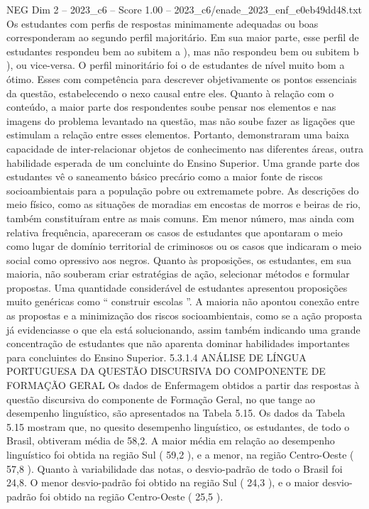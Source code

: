 \begin{textsample}{NEG Dim 2 – 2023\_c6 – Score 1.00 – 2023\_c6/enade\_2023\_enf\_e0eb49dd48.txt}
Os estudantes com perfis de respostas minimamente adequadas ou boas corresponderam ao segundo perfil majoritário.
Em sua maior parte, esse perfil de estudantes respondeu bem ao subitem a ), mas não respondeu bem ou subitem b ), ou vice-versa.
O perfil minoritário foi o de estudantes de nível muito bom a ótimo.
Esses com competência para descrever objetivamente os pontos essenciais da questão, estabelecendo o nexo causal entre eles.
Quanto à relação com o conteúdo, a maior parte dos respondentes soube pensar nos elementos e nas imagens do problema levantado na questão, mas não soube fazer as ligações que estimulam a relação entre esses elementos.
Portanto, demonstraram uma baixa capacidade de inter-relacionar objetos de conhecimento nas diferentes áreas, outra habilidade esperada de um concluinte do Ensino Superior.
Uma grande parte dos estudantes vê o saneamento básico precário como a maior fonte de riscos socioambientais para a população pobre ou extremamete pobre.
As descrições do meio físico, como as situações de moradias em encostas de morros e beiras de rio, também constituíram entre as mais comuns.
Em menor número, mas ainda com relativa frequência, apareceram os casos de estudantes que apontaram o meio como lugar de domínio territorial de criminosos ou os casos que indicaram o meio social como opressivo aos negros.
Quanto às proposições, os estudantes, em sua maioria, não souberam criar estratégias de ação, selecionar métodos e formular propostas.
Uma quantidade considerável de estudantes apresentou proposições muito genéricas como “ construir escolas ”.
A maioria não apontou conexão entre as propostas e a minimização dos riscos socioambientais, como se a ação proposta já evidenciasse o que ela está solucionando, assim também indicando uma grande concentração de estudantes que não aparenta dominar habilidades importantes para concluintes do Ensino Superior. 5.3.1.4 ANÁLISE DE LÍNGUA PORTUGUESA DA QUESTÃO DISCURSIVA DO COMPONENTE DE FORMAÇÃO GERAL Os dados de Enfermagem obtidos a partir das respostas à questão discursiva do componente de Formação Geral, no que tange ao desempenho linguístico, são apresentados na Tabela 5.15.
Os dados da Tabela 5.15 mostram que, no quesito desempenho linguístico, os estudantes, de todo o Brasil, obtiveram média de 58,2.
A maior média em relação ao desempenho linguístico foi obtida na região Sul ( 59,2 ), e a menor, na região Centro-Oeste ( 57,8 ).
Quanto à variabilidade das notas, o desvio-padrão de todo o Brasil foi 24,8.
O menor desvio-padrão foi obtido na região Sul ( 24,3 ), e o maior desvio-padrão foi obtido na região Centro-Oeste ( 25,5 ).

\end{textsample}
